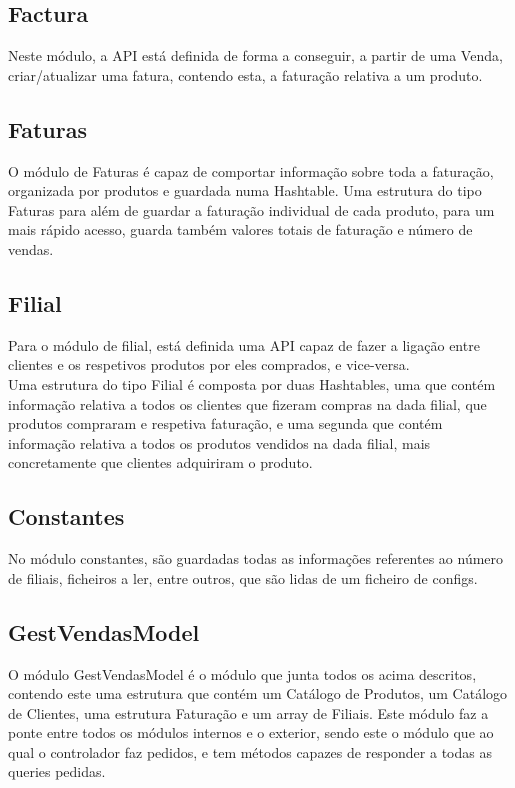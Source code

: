 \documentclass[a4paper]{report}
\begin{document}
\subsection{Factura}

Neste módulo, a API está definida de forma a conseguir, a partir de uma Venda,
criar/atualizar uma fatura, contendo esta, a faturação relativa a um produto.

\subsection{Faturas}

O módulo de Faturas é capaz de comportar informação sobre toda a faturação,
organizada por produtos e guardada numa Hashtable. Uma estrutura do tipo Faturas
para além de guardar a faturação individual de cada produto, para um mais rápido 
acesso, guarda também valores totais de faturação e número de vendas.

\subsection{Filial}

Para o módulo de filial, está definida uma API capaz de fazer a ligação entre 
clientes e os respetivos produtos por eles comprados, e vice-versa.\\
Uma estrutura do tipo Filial é composta por duas Hashtables, uma que contém
informação relativa a todos os clientes que fizeram compras na dada filial, 
que produtos compraram e respetiva faturação, e uma segunda que contém 
informação relativa a todos os produtos vendidos na dada filial, mais 
concretamente que clientes adquiriram o produto.

\subsection{Constantes}

No módulo constantes, são guardadas todas as informações referentes ao número de
filiais, ficheiros a ler, entre outros, que são lidas de um ficheiro de configs.

\subsection{GestVendasModel}

O módulo GestVendasModel é o módulo que junta todos os acima descritos, 
contendo este uma estrutura
que contém um Catálogo de Produtos, um Catálogo de Clientes, uma estrutura Faturação e 
um array de Filiais. Este módulo faz a ponte entre todos os módulos internos e o 
exterior, sendo este o módulo que ao qual o controlador faz pedidos, e tem 
métodos capazes de responder a todas as queries pedidas.
\end{document}
